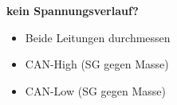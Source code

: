 \textbf{kein Spannungsverlauf?}

\begin{itemize}
\item
  Beide Leitungen durchmessen
\item
  CAN-High (SG gegen Masse)
\item
  CAN-Low (SG gegen Masse)
\end{itemize}
